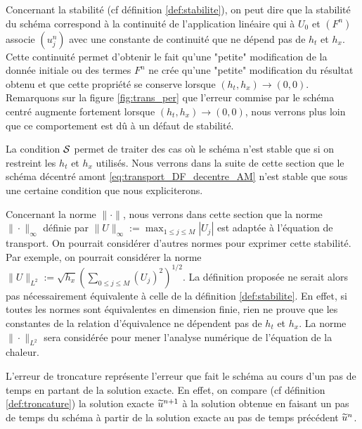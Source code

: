 \documentclass[12pt,a4paper,twoside]{article}
\begin{document}
Concernant la stabilit\'e (cf d\'efinition \ref{def:stabilite}),
on peut dire que la stabilit\'e du sch\'ema correspond \`a
la continuit\'e de l'application lin\'eaire qui \`a 
$U_0$ et $(F^n)$ associe $(u_j^n)$ 
avec une constante de continuit\'e que ne d\'epend pas
de $h_t$ et $h_x$.
Cette continuit\'e permet d'obtenir le fait qu'une "petite"
modification de la donn\'ee initiale ou des termes $F^n$
ne cr\'ee qu'une "petite" modification
du r\'esultat obtenu et que cette propri\'et\'e se conserve lorsque
$(h_t,h_x) \to (0,0)$.
Remarquons sur la figure \ref{fig:trans_per} que l'erreur commise
par le sch\'ema centr\'e augmente fortement lorsque
$(h_t,h_x) \to (0,0)$, nous verrons plus loin que ce comportement
est d\^u \`a un d\'efaut de stabilit\'e.


La condition $\mathcal{S}$ permet de traiter des cas o\`u le sch\'ema
n'est stable que si on restreint les $h_t$ et $h_x$ utilis\'es.
Nous verrons dans la suite de cette section que le sch\'ema 
d\'ecentr\'e amont \eqref{eq:transport_DF_decentre_AM} 
n'est stable que sous une certaine condition
que nous expliciterons.


Concernant la norme $\| \cdot \|$, nous verrons dans cette section que la norme
$\| \cdot \|_{\infty}$ d\'efinie par $\| U \|_{\infty} := \max_{1 \leq j \leq M} |U_j|$
est adapt\'ee \`a l'\'equation de transport.
On pourrait consid\'erer d'autres normes pour exprimer cette stabilit\'e.
Par exemple, on pourrait consid\'erer la norme
$\| U \|_{L^2} := \sqrt{h_x} (\sum_{0\leq j \leq M} (U_j)^2)^{1/2}$.
La d\'efinition propos\'ee ne serait alors pas n\'ecessairement
\'equivalente \`a celle de la d\'efinition \ref{def:stabilite}.
En effet, si toutes les normes sont \'equivalentes en dimension
finie, rien ne prouve que les constantes de la relation
d'\'equivalence ne d\'ependent pas de $h_t$ et $h_x$.
La norme $\| \cdot \|_{L^2}$ sera consid\'er\'ee pour mener l'analyse
num\'erique de l'\'equation de la chaleur.




L'erreur de troncature repr\'esente l'erreur que fait le sch\'ema
au cours d'un pas de temps en partant de la solution exacte.
En effet, on compare (cf d\'efinition \ref{def:troncature})
la solution exacte $\widetilde{u}^{n+1}$ \`a la solution 
obtenue en faisant un pas de temps du sch\'ema
\`a partir de la solution exacte au pas de temps
pr\'ec\'edent $\widetilde{u}^{n}$.
\end{document}

